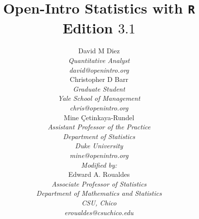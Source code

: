 \title{\huge Open-Intro Statistics with {\tt R} \vspace{1.5mm} \\ \Large Edition $3.1$}
\author{David M Diez \\
\small\emph{Quantitative Analyst} \\
\vspace{6mm}%
\small\emph{david@openintro.org} \\
Christopher D Barr \\
\small\emph{Graduate Student} \\
\small\emph{Yale School of Management} \\
\vspace{6mm}%
\small\emph{chris@openintro.org} \\
Mine \c{C}etinkaya-Rundel \\
\small\emph{Assistant Professor of the Practice} \\
\small\emph{Department of Statistics} \\
\small\emph{Duke University} \\
\vspace{6mm}%
\small\emph{mine@openintro.org} \\
\emph{Modified by:} \\
Edward A. Roualdes \\
\small\emph{Associate Professor of Statistics} \\
\small\emph{Department of Mathematics and Statistics} \\
\small\emph{CSU, Chico} \\
\small\emph{eroualdes@csuchico.edu}}
